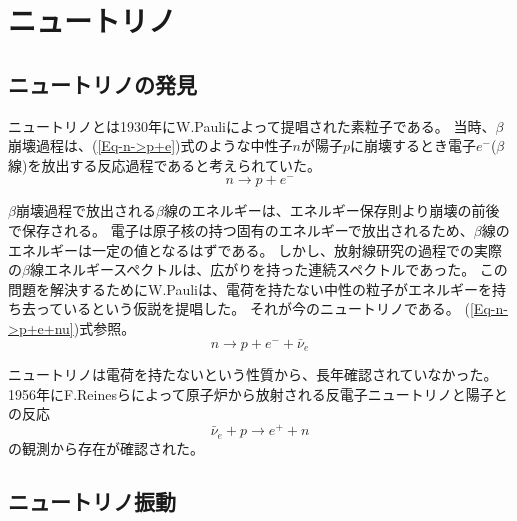 \documentclass[a4paper,10pt]{jreport}
\begin{document}
\section{ニュートリノ}



\subsection{ニュートリノの発見}

ニュートリノとは1930年にW.Pauliによって提唱された素粒子である。
当時、$\beta$崩壊過程は、(\ref{Eq-n->p+e})式のような中性子$n$が陽子$p$に崩壊するとき電子$e^-$($\beta$線)を放出する反応過程であると考えられていた。
\begin{equation} \label{Eq-n->p+e}
	n \to p+e^-
\end{equation}

$\beta$崩壊過程で放出される$\beta$線のエネルギーは、エネルギー保存則より崩壊の前後で保存される。
電子は原子核の持つ固有のエネルギーで放出されるため、$\beta$線のエネルギーは一定の値となるはずである。
しかし、放射線研究の過程での実際の$\beta$線エネルギースペクトルは、広がりを持った連続スペクトルであった。
この問題を解決するためにW.Pauliは、電荷を持たない中性の粒子がエネルギーを持ち去っているという仮説を提唱した。\cite{Pauli}
それが今のニュートリノである。
(\ref{Eq-n->p+e+nu})式参照。
\begin{equation} \label{Eq-n->p+e+nu}
	n \to p+e^-+\bar{\nu}_e
\end{equation}

ニュートリノは電荷を持たないという性質から、長年確認されていなかった。
1956年にF.Reinesらによって原子炉から放射される反電子ニュートリノと陽子との反応
\begin{equation}
	\bar{\nu}_e +p \to e^+ +n
\end{equation}
の観測から存在が確認された。



\subsection{ニュートリノ振動}
\end{document}
